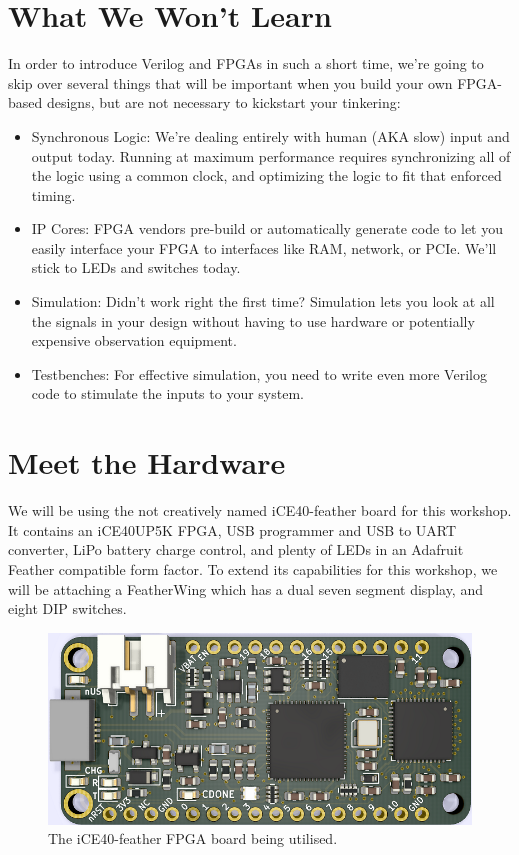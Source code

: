\documentclass[12pt,a4paper]{article}
\begin{document}
\section{What We Won't Learn}
In order to introduce Verilog and FPGAs in such a short time, we’re going to skip over several things that will be important when you build your own FPGA-based designs, but are not necessary to kickstart your tinkering: 
\begin{itemize}
	\item Synchronous Logic: We’re dealing entirely with human (AKA slow) input and output today. Running at maximum performance requires synchronizing all of the logic using a common clock, and optimizing the logic to fit that enforced timing.
	\item IP Cores​: FPGA vendors pre-build or automatically generate code to let you easily interface your FPGA to interfaces like RAM, network, or PCIe. We’ll stick to LEDs and switches today.
	\item Simulation​: Didn’t work right the first time? Simulation lets you look at all the signals in your design without having to use hardware or potentially expensive observation equipment.
	\item Testbenches​: For effective simulation, you need to write even more Verilog code to stimulate the inputs to your system.
\end{itemize}

\newpage
\section{Meet the Hardware}
We will be using the not creatively named iCE40-feather board for this workshop. It contains an iCE40UP5K FPGA, USB programmer and USB to UART converter, LiPo battery charge control, and plenty of LEDs in an Adafruit Feather compatible form factor. To extend its capabilities for this workshop, we will be attaching a FeatherWing which has a dual seven segment display, and eight DIP switches. 

\begin{figure}[H]
\begin{centering}
	\includegraphics[width=\linewidth]{top_render.png}
	\caption{The iCE40-feather FPGA board being utilised.}
\end{centering}
\end{figure}
\end{document}
